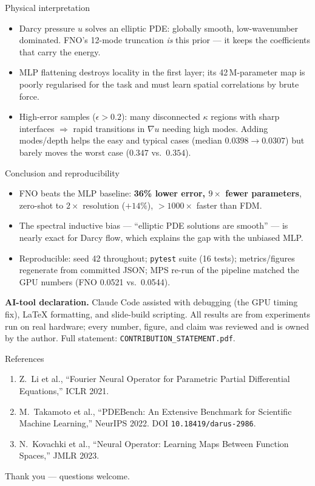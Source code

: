 \documentclass[aspectratio=169,11pt]{beamer}
\begin{document}
\begin{frame}{Physical interpretation}
\begin{itemize}
  \item Darcy pressure $u$ solves an elliptic PDE: globally smooth, low-wavenumber dominated. FNO's 12-mode truncation \emph{is} this prior --- it keeps the coefficients that carry the energy.
  \item MLP flattening destroys locality in the first layer; its 42\,M-parameter map is poorly regularised for the task and must learn spatial correlations by brute force.
  \item High-error samples ($\epsilon > 0.2$): many disconnected $\kappa$ regions with sharp interfaces $\Rightarrow$ rapid transitions in $\nabla u$ needing high modes. Adding modes/depth helps the easy and typical cases (median $0.0398 \to 0.0307$) but barely moves the worst case ($0.347$ vs.\ $0.354$).
\end{itemize}
\end{frame}

\begin{frame}{Conclusion and reproducibility}
\begin{itemize}
  \item FNO beats the MLP baseline: \textbf{36\% lower error, $9\times$ fewer parameters}, zero-shot to $2\times$ resolution ($+14\%$), $>1000\times$ faster than FDM.
  \item The spectral inductive bias --- ``elliptic PDE solutions are smooth'' --- is nearly exact for Darcy flow, which explains the gap with the unbiased MLP.
  \item Reproducible: seed 42 throughout; \texttt{pytest} suite (16 tests); metrics/figures regenerate from committed JSON; MPS re-run of the pipeline matched the GPU numbers (FNO 0.0521 vs.\ 0.0544).
\end{itemize}
\vfill
\footnotesize \textbf{AI-tool declaration.} Claude Code assisted with debugging (the GPU timing fix), LaTeX formatting, and slide-build scripting. All results are from experiments run on real hardware; every number, figure, and claim was reviewed and is owned by the author. Full statement: \texttt{CONTRIBUTION\_STATEMENT.pdf}.
\end{frame}

\begin{frame}{References}
\footnotesize
\begin{enumerate}
  \item Z.\ Li et al., ``Fourier Neural Operator for Parametric Partial Differential Equations,'' ICLR 2021.
  \item M.\ Takamoto et al., ``PDEBench: An Extensive Benchmark for Scientific Machine Learning,'' NeurIPS 2022. DOI \texttt{10.18419/darus-2986}.
  \item N.\ Kovachki et al., ``Neural Operator: Learning Maps Between Function Spaces,'' JMLR 2023.
\end{enumerate}
\vfill
\centering Thank you --- questions welcome.
\end{frame}
\end{document}
